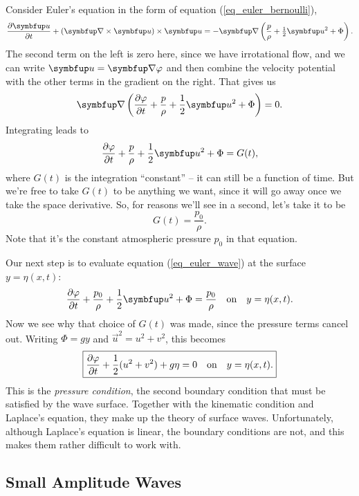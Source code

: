 Consider Euler's equation in the form of equation (\ref{eq_euler_bernoulli}),
\[
\frac{\partial \uu}{\partial t} + (\curl \uu ) \times \uu = -\grad \left( \frac{p}{\rho} + \tfrac{1}{2} \uu^2 + \Phi \right).
\]
The second term on the left is zero here, since we have irrotational flow, and we can write $\vec{u} = \grad \varphi$ and then combine the velocity potential with the other terms in the gradient on the right.  That gives us
\[
\grad \left( \dfdx{\varphi}{t} + \frac{p}{\rho} + \frac{1}{2} \vec{u}^2 + \Phi \right) = 0.
\]
Integrating leads to
\begin{equation}
\label{eq_euler_wave}
\dfdx{\varphi}{t} + \frac{p}{\rho} + \frac{1}{2} \vec{u}^2 + \Phi = G(t),
\end{equation}
where $G(t)$ is the integration ``constant'' -- it can still be a function of time.  But we're free to take $G(t)$ to be anything we want, since it will go away once we take the space derivative. So, for reasons we'll see in a second, let's take it to be
\begin{equation}
G(t) = \frac{p_0}{\rho}.
\end{equation}
Note that it's the constant atmospheric pressure $p_0$ in that equation.

Our next step is to evaluate equation (\ref{eq_euler_wave}) at the surface $y = \eta(x, t)$:
\begin{equation}
\label{eq_pressure_surface}
\dfdx{\varphi}{t} + \frac{p_0}{\rho} + \frac{1}{2} \vec{u}^2 + \Phi = \frac{p_0}{\rho} \quad \text{on} \quad y = \eta(x, t).
\end{equation}
Now we see why that choice of $G(t)$ was made, since the pressure terms cancel out.  Writing $\Phi = gy$ and $\vec{u}^2 = u^2 + v^2$, this becomes
\begin{equation}
\label{eq_pressure_cond}
\boxed{
\frac{\partial {\varphi}}{\partial {t}} +  \frac{1}{2}(u^2 + v^2) + g\eta = 0 \quad \text{on} \quad y = \eta(x, t).
}
\end{equation}
This is the \emph{pressure condition}, the second boundary condition that must be satisfied by the wave surface.  Together with the kinematic condition and Laplace's equation, they make up the theory of surface waves.  Unfortunately, although Laplace's equation is linear, the boundary conditions are not, and this makes them rather difficult to work with.  



\subsection{Small Amplitude Waves}

